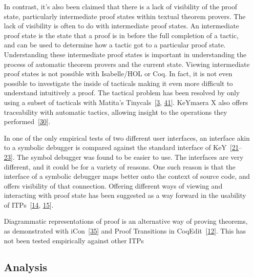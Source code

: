 \documentclass[
]{article}
\begin{document}
In contrast, it's also been claimed that there is a lack of visibility
of the proof state, particularly intermediate proof states within
textual theorem provers. The lack of visibility is often to do with
intermediate proof states. An intermediate proof state is the state that
a proof is in before the full completion of a tactic, and can be used to
determine how a tactic got to a particular proof state. Understanding
these intermediate proof states is important in understanding the
process of automatic theorem provers and the current state. Viewing
intermediate proof states is not possible with Isabelle/HOL or Coq. In
fact, it is not even possible to investigate the inside of tacticals
making it even more difficult to understand intuitively a proof. The
tactical problem has been resolved by only using a subset of tacticals
with Matita's Tinycals~{[}\protect\hyperlink{ref-asperti_user_2007}{3},
\protect\hyperlink{ref-zacchiroli_user_2007}{41}{]}. KeYmaera X also
offers traceability with automatic tactics, allowing insight to the
operations they
performed~{[}\protect\hyperlink{ref-mitsch_keymaera_2017}{30}{]}.

In one of the only empirical tests of two different user interfaces, an
interface akin to a symbolic debugger is compared against the standard
interface of
KeY~{[}\protect\hyperlink{ref-hentschel_empirical_2016}{21}--\protect\hyperlink{ref-hentschel_interactive_2016}{23}{]}.
The symbol debugger was found to be easier to use. The interfaces are
very different, and it could be for a variety of reasons. One such
reason is that the interface of a symbolic debugger maps better onto the
context of source code, and offers visibility of that connection.
Offering different ways of viewing and interacting with proof state has
been suggested as a way forward in the usability of
ITPs~{[}\protect\hyperlink{ref-eastaughffe_support_1998}{14},
\protect\hyperlink{ref-grebing_seamless_2020}{15}{]}.

Diagrammatic representations of proof is an alternative way of proving
theorems, as demonstrated with
iCon~{[}\protect\hyperlink{ref-shams_accessible_2018}{35}{]} and Proof
Transitions in
CoqEdit~{[}\protect\hyperlink{ref-berman_development_2014}{12}{]}. This
has not been tested empirically against other ITPs

\hypertarget{analysis}{%
\subsection{Analysis}\label{analysis}}
\end{document}
